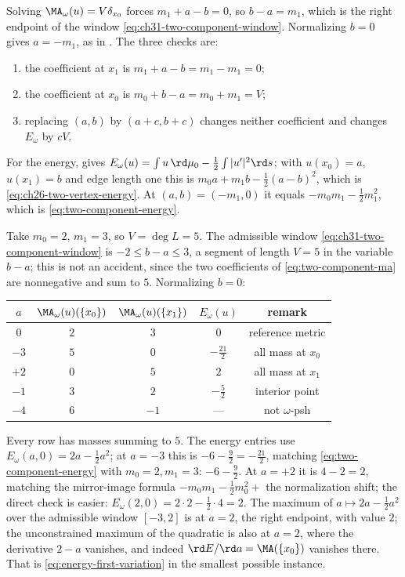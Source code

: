 Solving $\MA_\omega(u)=V\delta_{x_0}$ forces $m_1+a-b=0$, so
$b-a=m_1$, which is the right endpoint of the window
\eqref{eq:ch31-two-component-window}.  Normalizing $b=0$ gives
$a=-m_1$, as in .  The three checks are:
\begin{enumerate}
\item the coefficient at $x_1$ is $m_1+a-b=m_1-m_1=0$;
\item the coefficient at $x_0$ is $m_0+b-a=m_0+m_1=V$;
\item replacing $(a,b)$ by $(a+c,b+c)$ changes neither coefficient and
 changes $E_\omega$ by $cV$.
\end{enumerate}
For the energy,  gives
$E_\omega(u)=\int u\,\rd\mu_0-\tfrac12\int|u'|^2\rd s$; with
$u(x_0)=a$, $u(x_1)=b$ and edge length one this is
$m_0a+m_1b-\tfrac12(a-b)^2$, which is
\eqref{eq:ch26-two-vertex-energy}.  At $(a,b)=(-m_1,0)$ it equals
$-m_0m_1-\tfrac12m_1^2$, which is \eqref{eq:two-component-energy}.

\begin{example}
\label{ex:ch31-two-component-numbers}
Take $m_0=2$, $m_1=3$, so $V=\deg L=5$.  The admissible window
\eqref{eq:ch31-two-component-window} is $-2\leq b-a\leq3$, a segment of
length $V=5$ in the variable $b-a$; this is not an accident, since the
two coefficients of \eqref{eq:two-component-ma} are nonnegative and sum to
$5$.  Normalizing $b=0$:
\begin{center}
\small
\begin{tabular}{c|c|c|c|c}
\toprule
$a$&$\MA_\omega(u)(\{x_0\})$&$\MA_\omega(u)(\{x_1\})$
 &$E_\omega(u)$&remark\\
\midrule
$0$&$2$&$3$&$0$&reference metric\\
$-3$&$5$&$0$&$-\tfrac{21}2$&all mass at $x_0$\\
$+2$&$0$&$5$&$2$&all mass at $x_1$\\
$-1$&$3$&$2$&$-\tfrac52$&interior point\\
$-4$&$6$&$-1$&---&not $\omega$-psh\\
\bottomrule
\end{tabular}
\end{center}
Every row has masses summing to $5$.  The energy entries use
$E_\omega(a,0)=2a-\tfrac12a^2$; at $a=-3$ this is
$-6-\tfrac92=-\tfrac{21}2$, matching \eqref{eq:two-component-energy} with
$m_0=2,m_1=3$: $-6-\tfrac92$.  At $a=+2$ it is $4-2=2$, matching the
mirror-image formula $-m_0m_1-\tfrac12m_0^2+$ the normalization shift; the
direct check is easier: $E_\omega(2,0)=2\cdot2-\tfrac12\cdot4=2$.  The
maximum of $a\mapsto2a-\tfrac12a^2$ over the admissible window
$[-3,2]$ is at $a=2$, the right endpoint, with value $2$; the
unconstrained maximum of the quadratic is also at $a=2$, where the
derivative $2-a$ vanishes, and indeed $\rd E/\rd a=\MA(\{x_0\})$
vanishes there.  That is
\eqref{eq:energy-first-variation} in the smallest possible instance.
\end{example}

